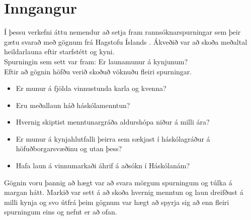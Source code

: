 \documentclass[12pt, git, draft]{rureport}
\begin{document}
\maketitle  %



\section{Inngangur} %

Í þessu verkefni áttu nemendur að setja fram rannsóknarspurningar sem þeir gætu svarað með gögnum frá Hagstofu Íslands \cite{H}. 
Ákveðið var að skoða meðaltal heildarlauna eftir starfstétt og kyni.\\
Spurningin sem sett var fram: Er launamunur á kynjunum? \\

Eftir að gögnin höfðu verið skoðuð vöknuðu fleiri spurningar.
\begin{itemize} 
	\item Er munur á fjölda vinnustunda karla og kvenna?
	\item Eru meðallaun háð háskólamenntun?
	\item Hvernig skiptist menntunargráða aldurshópa niður á milli ára?
	\item Er munur á kynjahlutfalli þeirra sem sækjast í háskólagráður á höfuðborgarsvæðinu og utan þess?
	\item Hafa laun á vinnumarkaði áhrif á aðsókn í Háskólanám?
\end{itemize}


Gögnin voru þannig að hægt var að svara mörgum spurningum og túlka á margan hátt. Markið var sett á að skoða hvernig menntun og laun dreifðust á milli kynja og svo útfrá þeim gögnum var hægt að spyrja sig að enn fleiri spurningum eins og nefnt er að ofan. \\
\end{document}
